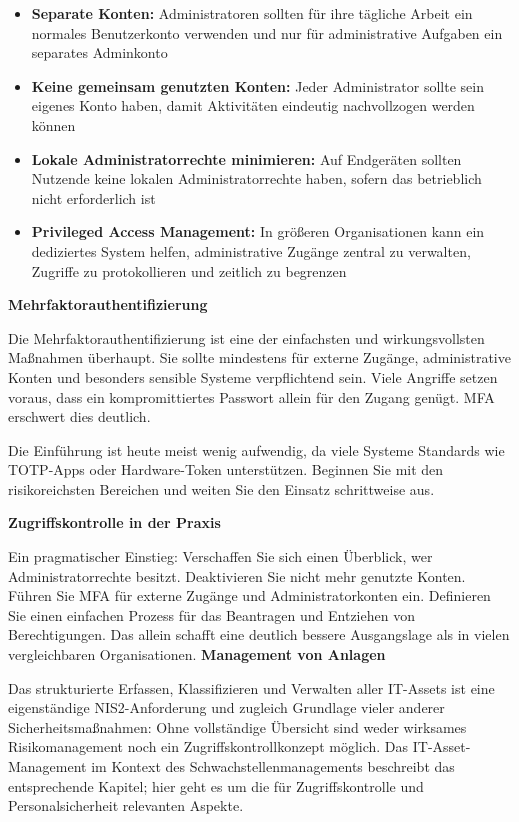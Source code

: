 \begin{itemize}
    \item \textbf{Separate Konten:} Administratoren sollten für ihre tägliche Arbeit ein normales Benutzerkonto verwenden und nur für administrative Aufgaben ein separates Adminkonto
    \item \textbf{Keine gemeinsam genutzten Konten:} Jeder Administrator sollte sein eigenes Konto haben, damit Aktivitäten eindeutig nachvollzogen werden können
    \item \textbf{Lokale Administratorrechte minimieren:} Auf Endgeräten sollten Nutzende keine lokalen Administratorrechte haben, sofern das betrieblich nicht erforderlich ist
    \item \textbf{Privileged Access Management:} In größeren Organisationen kann ein dediziertes System helfen, administrative Zugänge zentral zu verwalten, Zugriffe zu protokollieren und zeitlich zu begrenzen
\end{itemize}

\textbf{Mehrfaktorauthentifizierung}

Die Mehrfaktorauthentifizierung ist eine der einfachsten und wirkungsvollsten Maßnahmen überhaupt. Sie sollte mindestens für externe Zugänge, administrative Konten und besonders sensible Systeme verpflichtend sein. Viele Angriffe setzen voraus, dass ein kompromittiertes Passwort allein für den Zugang genügt. MFA erschwert dies deutlich.

Die Einführung ist heute meist wenig aufwendig, da viele Systeme Standards wie TOTP-Apps oder Hardware-Token unterstützen. Beginnen Sie mit den risikoreichsten Bereichen und weiten Sie den Einsatz schrittweise aus.

\textbf{Zugriffskontrolle in der Praxis}

Ein pragmatischer Einstieg: Verschaffen Sie sich einen Überblick, wer Administratorrechte besitzt. Deaktivieren Sie nicht mehr genutzte Konten. Führen Sie MFA für externe Zugänge und Administratorkonten ein. Definieren Sie einen einfachen Prozess für das Beantragen und Entziehen von Berechtigungen. Das allein schafft eine deutlich bessere Ausgangslage als in vielen vergleichbaren Organisationen.
\newpage
\textbf{Management von Anlagen}

Das strukturierte Erfassen, Klassifizieren und Verwalten aller IT-Assets ist eine eigenständige NIS2-Anforderung und zugleich Grundlage vieler anderer Sicherheitsmaßnahmen: Ohne vollständige Übersicht sind weder wirksames Risikomanagement noch ein Zugriffskontrollkonzept möglich. Das IT-Asset-Management im Kontext des Schwachstellenmanagements beschreibt das entsprechende Kapitel; hier geht es um die für Zugriffskontrolle und Personalsicherheit relevanten Aspekte.

